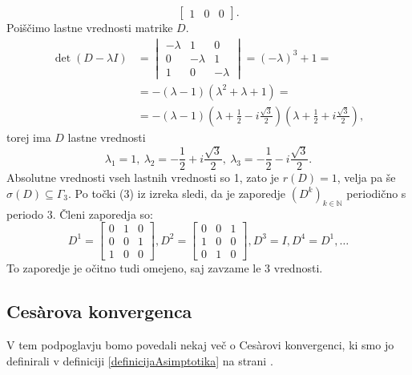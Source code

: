 \documentclass[mat1]{fmfdelo}
\newcommand{\N}{\mathbb N}
\begin{document}
\begin{zgled}
\begin{enumerate}
\begin{equation*}
\begin{bmatrix}
                1 & 0 & 0
            \end{bmatrix}.
        \end{equation*}
        Poiščimo lastne vrednosti matrike $D$.
        \begin{align*}
            \det (D - \lambda I) &=
            \begin{vmatrix}
                -\lambda & 1 & 0 \\
                0 & -\lambda & 1 \\
                1 & 0 & -\lambda
            \end{vmatrix}
            = (-\lambda)^3 + 1 = \\
            &= -(\lambda - 1)(\lambda^2+\lambda+1) = \\
            &= -(\lambda - 1)(\lambda + \frac{1}{2} - i\frac{\sqrt{3}}{2})(\lambda + \frac{1}{2} + i\frac{\sqrt{3}}{2}),
        \end{align*}
        torej ima $D$ lastne vrednosti \[\lambda_1=1,\ \lambda_2 = - \frac{1}{2} + i\frac{\sqrt{3}}{2},\ \lambda_3 = - \frac{1}{2} - i\frac{\sqrt{3}}{2}.\] Absolutne vrednosti vseh lastnih vrednosti so 1, zato je $r(D) = 1$, velja pa še $\sigma(D) \subseteq \Gamma_3$. Po točki (3) iz izreka sledi, da je zaporedje $(D^k)_{k\in\N}$ periodično s periodo $3$. Členi zaporedja so:
        \begin{equation*}
            D^1 =
            \begin{bmatrix}
                0 & 1 & 0 \\
                0 & 0 & 1 \\
                1 & 0 & 0
            \end{bmatrix},
            D^2 = 
            \begin{bmatrix}
                0 & 0 & 1 \\
                1 & 0 & 0 \\
                0 & 1 & 0
            \end{bmatrix},
            D^3 = I, D^4 = D^1, \ldots
        \end{equation*}
        To zaporedje je očitno tudi omejeno, saj zavzame le $3$ vrednosti.
    \end{enumerate}
\end{zgled}

\subsection{Ces\`arova konvergenca}
V tem podpoglavju bomo povedali nekaj več o Ces\`arovi konvergenci, ki smo jo definirali v definiciji \ref{definicijaAsimptotika} na strani \pageref{definicijaAsimptotika}.
\end{document}
